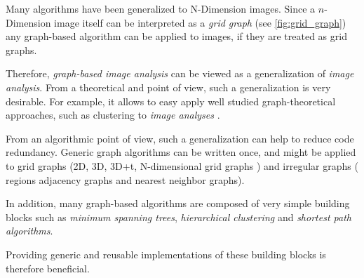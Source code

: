
Many algorithms have been generalized to N-Dimension images.
Since a $n$-Dimension image itself can be interpreted as a \emph{grid graph}  (see \cref{fig:grid_graph}) any graph-based algorithm can be applied to images, if they are treated as grid graphs.

Therefore, \emph{graph-based image analysis} can be viewed as a generalization of \emph{image analysis}.
From a theoretical and  point of view, such a generalization is very desirable.
For example, it allows to easy apply well studied graph-theoretical approaches, such as clustering
to  \emph{image analyses} \cite{vlachos_1993_csv,arbelaez_2006_cvpr,ohlander_1978_cgip}.

From an algorithmic point of view, such a generalization can help to reduce 
code redundancy.
Generic graph algorithms can be written once, and might be applied 
to grid graphs (2D, 3D, 3D+t, N-dimensional grid graphs ) and irregular graphs ( \eg regions adjacency graphs and nearest neighbor graphs).

In addition, many graph-based algorithms are composed  of
very simple building blocks such
as \emph{minimum spanning trees}, \emph{hierarchical clustering} and 
\emph{shortest path algorithms}. 

Providing generic and reusable implementations of these building blocks
 is therefore beneficial.






